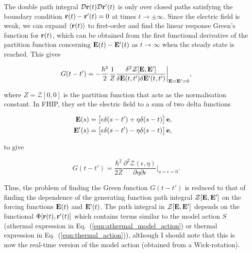 The double path integral $\mathcal{D}\vb{r}(t) \mathcal{D}\vb{r'}(t)$ is only over closed paths satisfying the boundary condition $\vb{r}(t) - \vb{r'}(t) = 0$ at times $t \to \pm \infty$. Since the electric field is weak, we can expand $\langle \vb{r} (t) \rangle$ to first-order and find the linear response Green's function for $\vb{r}(t)$, which can be obtained from the first functional derivative of the partition function concerning $\vb{E}(t) - \vb{E'}(t)$ as $t \to \infty$ when the steady state is reached. This gives

\begin{equation}
    G(t - t') = - \frac{\hbar^2}{2} \frac{1}{Z} \frac{\delta^2 \mathcal{Z}[\vb{E}, \vb{E'}]}{\delta \vb{E}(t, t') \delta \vb{E'}(t, t')} \biggr\rvert_{\vb{E}=\vb{E'} = 0},
\end{equation}

where $Z = \mathcal{Z}[0, 0]$ is the partition function that acts as the normalisation constant. In FHIP, they set the electric field to a sum of two delta functions

\begin{subequations}
    \begin{align}
        \begin{split}
            \vb{E}(s) &= \left[\epsilon \delta(s - t') + \eta \delta(s - t)\right] \vb{e},
        \end{split}\\
        \begin{split}
            \vb{E'}(s) &= \left[\epsilon \delta(s - t') - \eta \delta(s - t)\right] \vb{e},
        \end{split}
    \end{align}
\end{subequations}

to give

\begin{equation}
    G(t - t') = \frac{\hbar^2}{2Z}\frac{\partial^2 \mathcal{Z}(\epsilon, \eta)}{\partial\eta\partial\epsilon} \biggr\rvert_{\eta=\epsilon=0}.
\end{equation}

Thus, the problem of finding the Green function $G(t - t')$ is reduced to that of finding the dependence of the generating function path integral $\mathcal{Z[\vb{E}, \vb{E'}]}$ on the forcing functions $\vb{E}(t)$ and $\vb{E'}(t)$. The path integral in $\mathcal{Z[\vb{E}, \vb{E'}]}$ depends on the functional $\Phi[\vb{r}(t), \vb{r'}(t)]$ which contains terms similar to the model action $S$ (athermal expression in Eq.~(\ref{eqn:athermal_model_action}) or thermal expression in Eq.~(\ref{eqn:thermal_action})), although I should note that this is now the real-time version of the model action (obtained from a Wick-rotation). 

